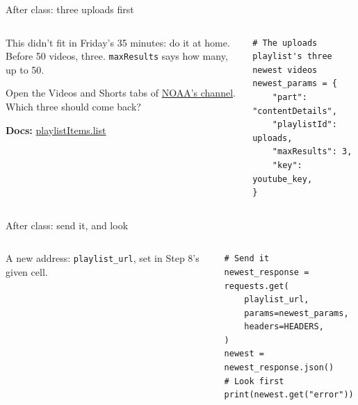 \documentclass[9pt,aspectratio=169]{beamer}
\begin{document}
\begin{frame}[fragile]{After class: three uploads first}
    \begin{columns}[T]
        \begin{column}{0.37\textwidth}
            This didn't fit in Friday's 35 minutes: do it at home. Before 50 videos, three. \texttt{maxResults} says how many, up to 50.

            \medskip
            Open the Videos and Shorts tabs of \href{https://www.youtube.com/@NOAA/videos}{NOAA's channel}. Which three should come back?

            \medskip
            {\scriptsize\textbf{Docs:} \href{https://developers.google.com/youtube/data/reference/rest/v3/playlistItems/list}{playlistItems.list}\par}
        \end{column}
        \begin{column}{0.6\textwidth}
\begin{lstlisting}
# The uploads playlist's three newest videos
newest_params = {
    "part": "contentDetails",
    "playlistId": uploads,
    "maxResults": 3,
    "key": youtube_key,
}
\end{lstlisting}
        \end{column}
    \end{columns}
\end{frame}

\begin{frame}[fragile]{After class: send it, and look}
    \begin{columns}[T]
        \begin{column}{0.37\textwidth}
            A new address: \texttt{playlist\_url}, set in Step 8's given cell.
        \end{column}
        \begin{column}{0.6\textwidth}
\begin{lstlisting}
# Send it
newest_response = requests.get(
    playlist_url,
    params=newest_params,
    headers=HEADERS,
)
newest = newest_response.json()
# Look first
print(newest.get("error"))
\end{lstlisting}
        \end{column}
    \end{columns}
\end{frame}
\end{document}
